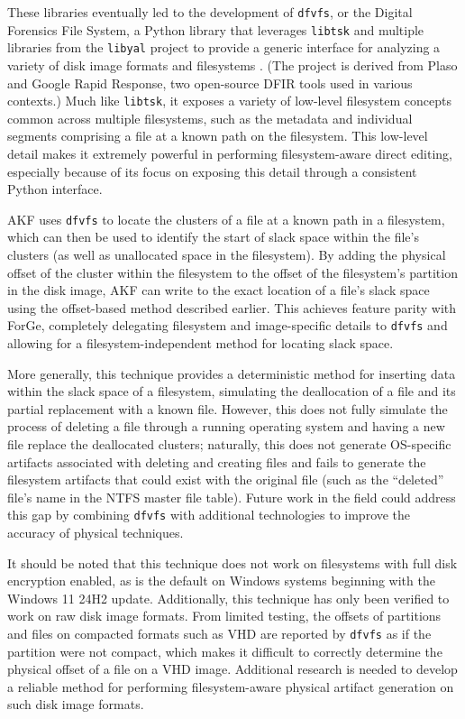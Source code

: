 These libraries eventually led to the development of
\passthrough{\lstinline!dfvfs!}, or the Digital Forensics File System, a
Python library that leverages \passthrough{\lstinline!libtsk!} and
multiple libraries from the \passthrough{\lstinline!libyal!} project to
provide a generic interface for analyzing a variety of disk image
formats and filesystems \cite{Log2timelineDfvfs2025}. (The project
is derived from Plaso and Google Rapid Response, two open-source DFIR
tools used in various contexts.) Much like
\passthrough{\lstinline!libtsk!}, it exposes a variety of low-level
filesystem concepts common across multiple filesystems, such as the
metadata and individual segments comprising a file at a known path on
the filesystem. This low-level detail makes it extremely powerful in
performing filesystem-aware direct editing, especially because of its
focus on exposing this detail through a consistent Python interface.

AKF uses \passthrough{\lstinline!dfvfs!} to locate the clusters of a
file at a known path in a filesystem, which can then be used to identify
the start of slack space within the file's clusters (as well as
unallocated space in the filesystem). By adding the physical offset of
the cluster within the filesystem to the offset of the filesystem's
partition in the disk image, AKF can write to the exact location of a
file's slack space using the offset-based method described earlier. This
achieves feature parity with ForGe, completely delegating filesystem and
image-specific details to \passthrough{\lstinline!dfvfs!} and allowing
for a filesystem-independent method for locating slack space.

More generally, this technique provides a deterministic method for
inserting data within the slack space of a filesystem, simulating the
deallocation of a file and its partial replacement with a known file.
However, this does not fully simulate the process of deleting a file
through a running operating system and having a new file replace the
deallocated clusters; naturally, this does not generate OS-specific
artifacts associated with deleting and creating files and fails to
generate the filesystem artifacts that could exist with the original
file (such as the ``deleted'' file's name in the NTFS master file
table). Future work in the field could address this gap by combining
\passthrough{\lstinline!dfvfs!} with additional technologies to improve
the accuracy of physical techniques.

It should be noted that this technique does not work on filesystems with
full disk encryption enabled, as is the default on Windows systems
beginning with the Windows 11 24H2 update. Additionally, this technique
has only been verified to work on raw disk image formats. From limited
testing, the offsets of partitions and files on compacted formats such
as VHD are reported by \passthrough{\lstinline!dfvfs!} as if the
partition were not compact, which makes it difficult to correctly
determine the physical offset of a file on a VHD image. Additional
research is needed to develop a reliable method for performing
filesystem-aware physical artifact generation on such disk image
formats.
